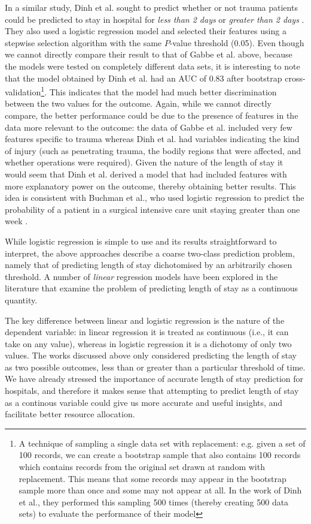 In a similar study, Dinh et al. sought to predict whether or not trauma
patients could be predicted to stay in hospital for \textit{less than 2 days}
or \textit{greater than 2 days} \citep{Dinh2013a}.
They also used a logistic regression model and
selected their features using a stepwise selection algorithm with the same
$P$-value threshold (0.05). Even though we cannot directly compare their result
to that
of Gabbe et al. above, because the models were tested on completely different
data sets, it is interesting to note that the model obtained by Dinh et al.
had an AUC of 0.83 after bootstrap cross-validation\footnote{A technique of
sampling a single data set with replacement: e.g. given a set of 100 records,
we can create a bootstrap sample that also contains 100 records which contains
records from the original set drawn at random with replacement. This means that
some records may appear in the bootstrap sample more than once and some may not
appear at all. In the work of Dinh et al., they performed this sampling 500
times (thereby creating 500 data sets) to evaluate the performance of their
model}. This indicates that the model had much better discrimination between
the two values for the outcome. Again, while we cannot directly compare, the
better performance could be due to the presence of features in the data more
relevant to the outcome: the data of Gabbe et al. included very few features
specific to trauma \citep{Gabbe2005} whereas Dinh
et al. had variables indicating the kind of injury (such as penetrating trauma,
the bodily regions that were affected, and whether operations
were required). Given the nature of the length of stay it would seem that Dinh
et al. derived a model that had included features with more explanatory power
on the outcome, thereby obtaining better results. This idea is consistent with
Buchman et al., who used logistic regression to predict the probability of a
patient in a surgical intensive care unit staying greater than one
week \citep{Buchman1994}.

While logistic regression is simple to use and its results straightforward
to interpret, the above approaches describe a coarse two-class prediction
problem, namely that of predicting length of stay dichotomised by an
arbitrarily chosen threshold.
A number of \textit{linear} regression models have been
explored in the literature that examine the problem of predicting length of stay
as a continuous quantity.

The key difference between linear and logistic regression is the nature of the
dependent variable: in linear regression it is treated as continuous (i.e., it
can take on any value), whereas in logistic regression it is a dichotomy of
only two values. The works discussed above only considered predicting the
length of stay as two possible outcomes, less than or greater than a particular
threshold of time. We have already stressed the importance of accurate length
of stay prediction for hospitals, and therefore it makes sense that attempting
to predict length of stay as a continous variable could give us more accurate
and useful insights, and facilitate better resource allocation.

